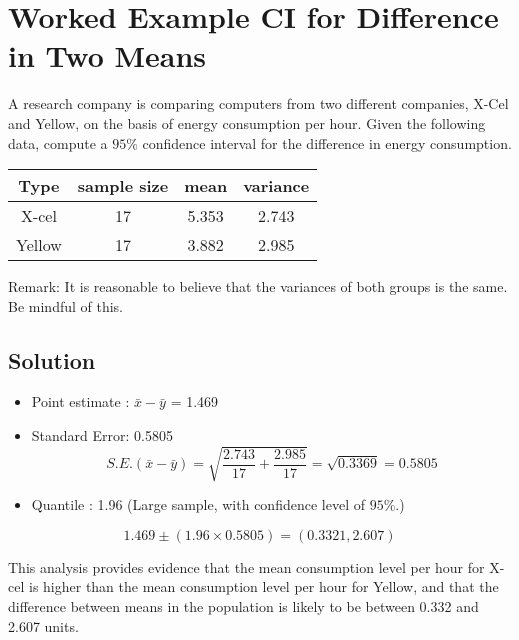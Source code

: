 \documentclass[a4paper,12pt]{article}
\begin{document}
\section*{Worked Example CI for Difference in Two Means}
A research company is comparing computers from two different companies, X-Cel and Yellow, on the basis of energy consumption per hour. Given the following data, compute a $95\%$ confidence interval for the difference in energy consumption.
\begin{center}
	\begin{tabular}{|c|c|c|c|}
		\hline
		Type & sample size & mean & variance \\ \hline
		X-cel & 17 & 5.353 & 2.743 \\ \hline
		Yellow & 17 & 3.882 & 2.985 \\ \hline
	\end{tabular}
\end{center}
Remark: It is reasonable to believe that the variances of both groups is the same. Be mindful of this.

\subsection*{Solution}
\begin{itemize}
	\item Point estimate : $\bar{x} - \bar{y}$ = 1.469
	\item Standard Error: 0.5805
	\[ S.E.(\bar{x}-\bar{y}) = \sqrt{\frac{2.743}{17} + \frac{2.985}{17}} = \sqrt{0.3369} = 0.5805 \]
	\item Quantile : 1.96 (Large sample, with confidence level of $95\%$.)
\end{itemize}

\[ 1.469  \pm (1.96 \times 0.5805) = (0.3321,2.607) \]


\noindent This analysis provides evidence that the mean consumption level per hour for X-cel is higher than the mean consumption level per hour for Yellow, and that the difference between means in the population is likely to be between 0.332 and 2.607 units.
\newpage
\end{document}
